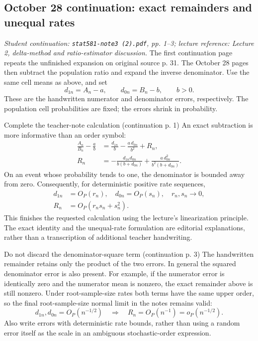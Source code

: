 \documentclass[12pt]{article}
\begin{document}
\subsection{October 28 continuation: exact remainders and unequal rates}
\textit{Student continuation: \texttt{stat581-note3 (2).pdf}, pp. 1--3;
lecture reference: Lecture 2, delta-method and ratio-estimator discussion.}
The first continuation page repeats the unfinished expansion on original
source p. 31. The October 28 pages then subtract the population ratio and
expand the inverse denominator. Use the same cell means as above, and set
\begin{equation}
 d_{1n}=A_n-a,\qquad d_{0n}=B_n-b,\qquad b>0.
\end{equation}
These are the handwritten numerator and denominator errors, respectively.
The population cell probabilities are fixed; the errors shrink in probability.
\begin{todobox}{Complete the teacher-note calculation (continuation p. 1)}
An exact subtraction is more informative than an order symbol:
\begin{align}
 \frac{A_n}{B_n}-\frac ab
 &=\frac{d_{1n}}b-\frac{a\,d_{0n}}{b^2}+R_n,\\
 R_n&=-\frac{d_{1n}d_{0n}}{b(b+d_{0n})}
       +\frac{a\,d_{0n}^2}{b^2(b+d_{0n})}.
\end{align}
On an event whose probability tends to one, the denominator is bounded
away from zero. Consequently, for deterministic positive rate sequences,
\begin{align}
 d_{1n}&=O_P(r_n),\quad d_{0n}=O_P(s_n),\quad r_n,s_n\longrightarrow0,\\
 R_n&=O_P(r_ns_n+s_n^2).
\end{align}
This finishes the requested calculation using the lecture's linearization
principle. The exact identity and the unequal-rate formulation are editorial
explanations, rather than a transcription of additional teacher handwriting.
\end{todobox}
\begin{correctionbox}{Do not discard the denominator-square term (continuation p. 3)}
The handwritten remainder retains only the product of the two errors.
In general the squared denominator error is also present. For example,
if the numerator error is identically zero and the numerator mean is
nonzero, the exact remainder above is still nonzero. Under root-sample-size
rates both terms have the same upper order, so the final root-sample-size
normal limit in the notes remains valid:
\begin{equation}
 d_{1n},d_{0n}=O_P(n^{-1/2})\quad\Longrightarrow\quad
 R_n=O_P(n^{-1})=o_P(n^{-1/2}).
\end{equation}
Also write errors with deterministic rate bounds, rather than using a random
error itself as the scale in an ambiguous stochastic-order expression.
\end{correctionbox}
\end{document}
